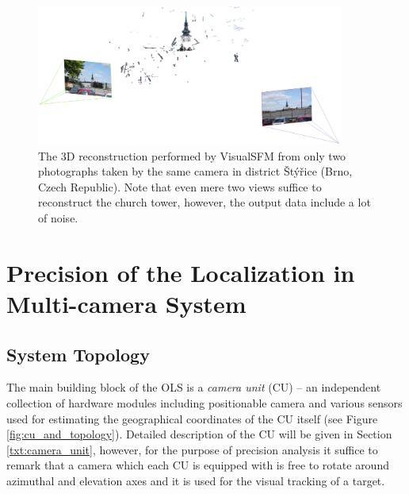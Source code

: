 \begin{figure}[tbh]
	\centering
	\includegraphics[width=0.9\textwidth]{fig/visualsfm_tower.png}
	\caption{The 3D reconstruction performed by VisualSFM from only two photographs taken by the same camera in district Štýřice (Brno, Czech Republic). Note that even mere two views suffice to reconstruct the church tower, however, the output data include a lot of noise.}
	\label{fig:visualsfm_tower}
\end{figure}

\chapter{Precision of the Localization in Multi-camera System} \label{txt:precision_of_the_localization}

\vata[2]

\section{System Topology} \label{txt:system_topology}

The main building block of the OLS is a \textit{camera unit} (CU) -- an independent collection of hardware modules including positionable camera and various sensors used for estimating the geographical coordinates of the CU itself (see Figure \ref{fig:cu_and_topology}). Detailed description of the CU will be given in Section \ref{txt:camera_unit}, however, for the purpose of precision analysis it suffice to remark that a camera which each CU is equipped with is free to rotate around azimuthal and elevation axes and it is used for the visual tracking of a target.

